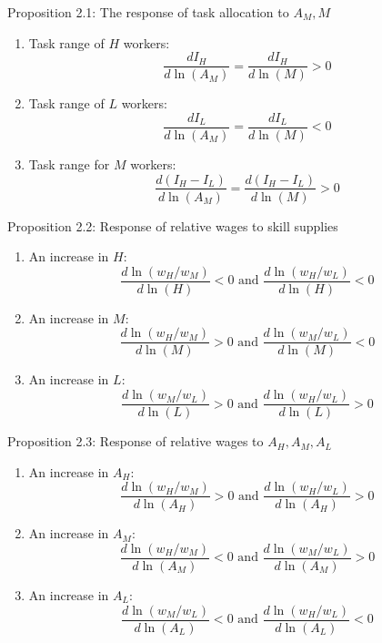 \documentclass[notes=show]{beamer}
\begin{document}
\begin{frame}{Proposition 2.1: The response of task allocation to $A_{M},M$}
\begin{enumerate}
\item Task range of $H$ workers:
\[
\frac{dI_{H}}{d \ln (A_{M})} = \frac{d I_{H}}{d \ln (M)} > 0
\]
\item Task range of $L$ workers:
\[
\frac{dI_{L}}{d \ln (A_{M})} = \frac{d I_{L}}{d \ln (M)} < 0
\]
\item Task range for $M$ workers:
\[
\frac{d (I_{H} - I_{L})}{d \ln (A_{M})} = \frac{d (I_{H} - I_{L})}{d \ln (M)} > 0
\]
\end{enumerate}
\end{frame}

\begin{frame}{Proposition 2.2: Response of relative wages to skill supplies}
\begin{enumerate}
\item An increase in $H$:
\[
\frac{d \ln (w_{H}/w_{M})}{d \ln (H)} < 0 \text{ and } \frac{d \ln (w_{H}/w_{L})}{d \ln (H)} < 0
\]
\item An increase in $M$:
\[
\frac{d \ln (w_{H}/w_{M})}{d \ln (M)} > 0 \text{ and } \frac{d \ln (w_{M}/w_{L})}{d \ln (M)} < 0
\]
\item An increase in $L$:
\[
\frac{d \ln (w_{M}/w_{L})}{d \ln (L)} > 0  \text{ and } \frac{d \ln (w_{H}/w_{L})}{d \ln (L)} > 0
\]
\end{enumerate}
\end{frame}

\begin{frame}{Proposition 2.3: Response of relative wages to $A_{H}, A_{M}, A_{L}$}
\begin{enumerate}
\item An increase in $A_{H}$:
\[
\frac{d \ln (w_{H}/w_{M})}{d \ln (A_{H})} > 0  \text{ and } \frac{d \ln (w_{H}/w_{L})}{d \ln (A_{H})} > 0
\]
\item An increase in $A_{M}$:
\[
\frac{d \ln (w_{H}/w_{M})}{d \ln (A_{M})} < 0 \text{ and } \frac{d \ln (w_{M}/w_{L})}{d \ln (A_{M})} > 0
\]
\item An increase in $A_{L}$:
\[
\frac{d \ln (w_{M}/w_{L})}{d \ln (A_{L})} < 0 \text{ and } \frac{d \ln (w_{H}/w_{L})}{d \ln (A_{L})} < 0
\]
\end{enumerate}
\end{frame}
\end{document}
